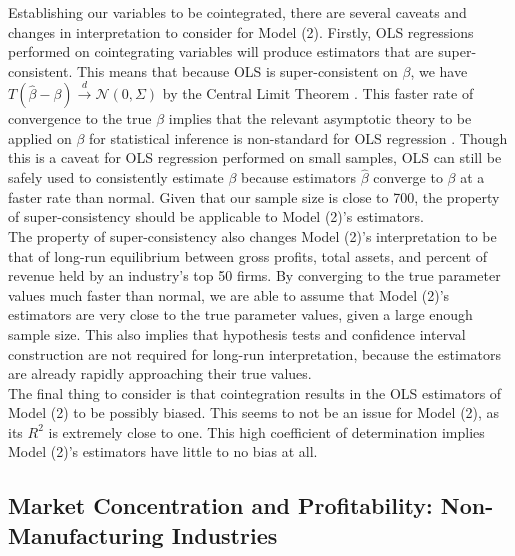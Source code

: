 Establishing our variables to be cointegrated, there are several caveats and changes in interpretation to consider for Model (2). Firstly, OLS regressions performed on cointegrating variables will produce estimators that are super-consistent. This means that because OLS is super-consistent on $\beta$, we have $T(\hat{\beta} - \beta) \xrightarrow{d} \mathcal{N}(0, \Sigma)$ by the Central Limit Theorem \cite[De Pace, 2016]{DePace16}. This faster rate of convergence to the true $\beta$ implies that the relevant asymptotic theory to be applied on $\beta$ for statistical inference is non-standard for OLS regression \cite[De Pace, 2016]{DePace16}. Though this is a caveat for OLS regression performed on small samples, OLS can still be safely used to consistently estimate $\beta$ because estimators $\hat{\beta}$ converge to $\beta$ at a faster rate than normal. Given that our sample size is close to 700, the property of super-consistency should be applicable to Model (2)'s estimators. \\

The property of super-consistency also changes Model (2)'s interpretation to be that of long-run equilibrium between gross profits, total assets, and percent of revenue held by an industry's top 50 firms. By converging to the true parameter values much faster than normal, we are able to assume that Model (2)'s estimators are very close to the true parameter values, given a large enough sample size. This also implies that hypothesis tests and confidence interval construction are not required for long-run interpretation, because the estimators are already rapidly approaching their true values. \\

The final thing to consider is that cointegration results in the OLS estimators of Model (2) to be possibly biased. This seems to not be an issue for Model (2), as its $R^{2}$ is extremely close to one. This high coefficient of determination implies Model (2)'s estimators have little to no bias at all.
\fi

\subsection{Market Concentration and Profitability: Non-Manufacturing Industries}


